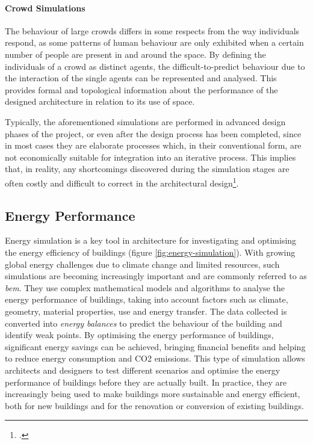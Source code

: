 \documentclass[a4paper, 12pt]{report}
\begin{document}
\paragraph{Crowd Simulations}\label{par:crowd-simulations}

The behaviour of large crowds differs in some respects from the way individuals respond, as some patterns of human behaviour are only exhibited when a certain number of people are present in and around the space. By defining the individuals of a crowd as distinct agents, the difficult-to-predict behaviour due to the interaction of the single agents can be represented and analysed. This provides formal and topological information about the performance of the designed architecture in relation to its use of space.

Typically, the aforementioned simulations are performed in advanced design phases of the project, or even after the design process has been completed, since in most cases they are elaborate processes which, in their conventional form, are not economically suitable for integration into an iterative process. This implies that, in reality, any shortcomings discovered during the simulation stages are often costly and difficult to correct in the architectural design\footcite{ali2023architectural}.

\subsection{Energy Performance}\label{subsec:energy-performance}

Energy simulation is a key tool in architecture for investigating and optimising the energy efficiency of buildings (figure \ref{fig:energy-simulation}). With growing global energy challenges due to climate change and limited resources, such simulations are becoming increasingly important and are commonly referred to as \textit{\acrfull{bem}}. They use complex mathematical models and algorithms to analyse the energy performance of buildings, taking into account factors such as climate, geometry, material properties, use and energy transfer. The data collected is converted into \textit{energy balances} to predict the behaviour of the building and identify weak points. By optimising the energy performance of buildings, significant energy savings can be achieved, bringing financial benefits and helping to reduce energy consumption and CO2 emissions. This type of simulation allows architects and designers to test different scenarios and optimise the energy performance of buildings before they are actually built. In practice, they are increasingly being used to make buildings more sustainable and energy efficient, both for new buildings and for the renovation or conversion of existing buildings.
\end{document}
